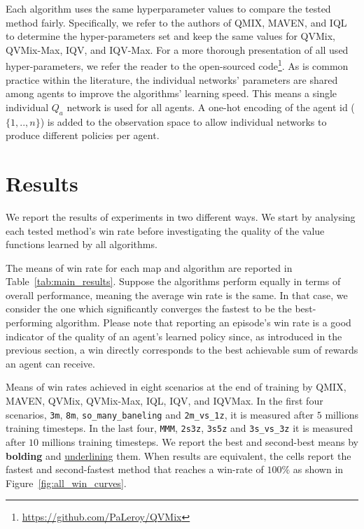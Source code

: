 Each algorithm uses the same hyperparameter values to compare the tested method fairly.
Specifically, we refer to the authors of QMIX, MAVEN, and IQL to determine the hyper-parameters set and keep the same values for QVMix, QVMix-Max, IQV, and IQV-Max. 
For a more thorough presentation of all used hyper-parameters, we refer the reader to the open-sourced code\footnote{\url{https://github.com/PaLeroy/QVMix}}.
As is common practice within the literature, the individual networks' parameters are shared among agents to improve the algorithms' learning speed.
This means a single individual $Q_a$ network is used for all agents.
A one-hot encoding of the agent id ($\{1,..,n\}$) is added to the observation space to allow individual networks to produce different policies per agent.

\section{Results} \label{sec:ch4_results}
We report the results of experiments in two different ways.
We start by analysing each tested method's win rate before investigating the quality of the value functions learned by all algorithms.

The means of win rate for each map and algorithm are reported in Table~\ref{tab:main_results}. 
Suppose the algorithms perform equally in terms of overall performance, meaning the average win rate is the same. 
In that case, we consider the one which significantly converges the fastest to be the best-performing algorithm.
Please note that reporting an episode's win rate is a good indicator of the quality of an agent's learned policy since, as introduced in the previous section, a win directly corresponds to the best achievable sum of rewards an agent can receive.

\begin{table}
    \centering
    
    \caption{
    Means of win rates achieved in eight scenarios at the end of training by QMIX, MAVEN, QVMix, QVMix-Max, IQL, IQV, and IQVMax. 
    In the first four scenarios, \texttt{3m}, \texttt{8m}, \texttt{so\_many\_baneling} and \texttt{2m\_vs\_1z}, it is measured after $5$ millions training timesteps.
    In the last four, \texttt{MMM}, \texttt{2s3z}, \texttt{3s5z} and \texttt{3s\_vs\_3z} it is measured after $10$ millions training timesteps.
    We report the best and second-best means by \textbf{bolding} and \underline{underlining} them. When results are equivalent, the cells report the fastest and second-fastest method that reaches a win-rate of $100\%$ as shown in Figure~\ref{fig:all_win_curves}.}
    \label{tab:main_results}
\end{table}

